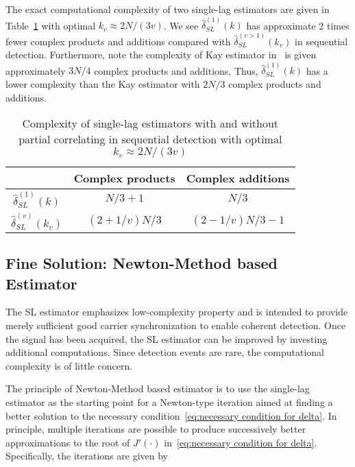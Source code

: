 The exact computational complexity of two single-lag estimators are given in Table~\ref{table:computational complexity comparison} with optimal $k_v \approx 2N/(3v)$. 
We see $\hat{\delta}_{SL}^{(1)}(k)$ has approximate 2 times fewer complex products and additions compared with $\hat{\delta}_{SL}^{(v>1)}(k_v)$ in sequential detection.
Furthermore, note the complexity of Kay estimator in~\cite{Morelli_Mengali_98} is given approximately $3N/4$ complex products and additions, 
Thus, $\hat{\delta}_{SL}^{(1)}(k)$ has a lower complexity than the Kay estimator with $2N/3$ complex products and additions.

\begin{table}[t]
  \caption{Complexity of single-lag estimators with and without partial correlating in sequential detection with optimal $k_v\approx2N/(3v)$}  %
  \centering 
  \begin{tabular}{c c c} 
  \hline\hline 
   & Complex products & Complex additions \\ [0.5ex] 
  \hline 
  $\hat{\delta}_{SL}^{(1)}(k)$  & $N/3+1$ & $N/3$ \\ 
  $\hat{\delta}_{SL}^{(v)}(k_v)$ & $(2+1/v) N/3$ & $(2-1/v)N/3-1$ \\ [1ex]
  \hline
  \end{tabular}
  \label{table:computational complexity comparison}
\end{table}

\subsection{Fine Solution: Newton-Method based Estimator}

The SL estimator emphasizes low-complexity property and is intended
to provide merely sufficient good carrier synchronization to enable coherent detection.
Once the signal has been acquired, the SL estimator can be improved by 
investing additional computations. Since detection events are rare, the computational
complexity is of little concern.

The principle of Newton-Method based estimator is to use the single-lag estimator as the starting point for a Newton-type iteration 
aimed at finding a better solution to the necessary condition~\eqref{eq:necessary condition for delta}. 
In principle, multiple iterations are possible to produce successively better approximations to the root of
$J'(\cdot)$ in~\eqref{eq:necessary condition for delta}. Specifically, the iterations are given by

